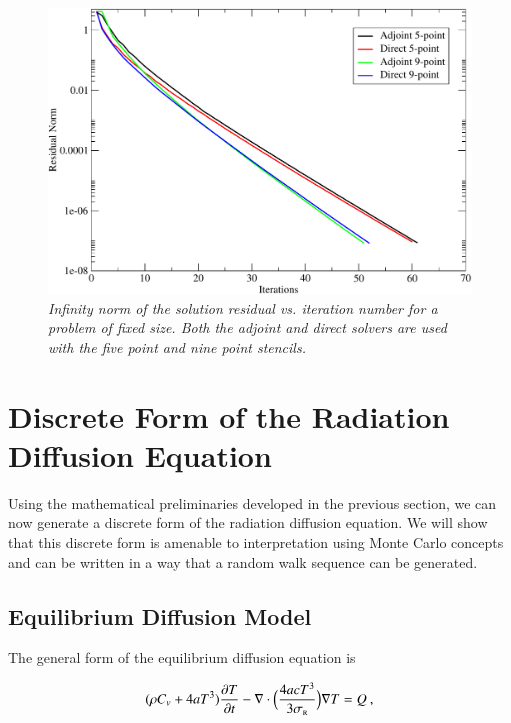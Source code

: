 \documentclass[preprint,12pt]{elsarticle}
\newcommand{\Cv}{\ensuremath{C_{v}}}
\newcommand{\ros}{\ensuremath{\sigma_{\scriptscriptstyle\mathrm{R}}}}
\begin{document}
\begin{figure}[h!]
  \centering
  \includegraphics[width=5in,clip]{Adjoint_Direct_Convergence.pdf}
  \caption{\sl Infinity norm of the solution residual vs. iteration
    number for a problem of fixed size. Both the adjoint and direct
    solvers are used with the five point and nine point stencils.}
  \label{fig:poisson_convergence}
\end{figure}

\section{Discrete Form of the Radiation Diffusion Equation}
\label{sec:discr-form-radi}

Using the mathematical preliminaries developed in the previous
section, we can now generate a discrete form of the radiation
diffusion equation. We will show that this discrete form is amenable
to interpretation using Monte Carlo concepts and can be written in a
way that a random walk sequence can be generated.

\subsection{Equilibrium Diffusion Model}

The general form of the equilibrium diffusion equation is
\cite{morel_1996}

\begin{equation} 
  (\rho\Cv + 4aT^{3})\pder{T}{t} -
  \nabla\cdot{\Bigl(\frac{4acT^{3}}{3\ros}\Bigr)\grad{T}} = Q\:,
  \label{eq:eq-diff-T}
\end{equation}
\end{document}
